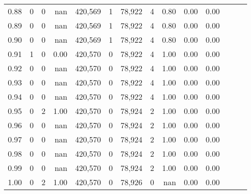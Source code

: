 \begin{tabular}{rrrrrrrrrrrrrr}
0.88 &       0 &      0 &   nan &  420,569 &        1 &  78,922 &       4 &  0.80 &  0.00 &      0.00 \\
0.89 &       0 &      0 &   nan &  420,569 &        1 &  78,922 &       4 &  0.80 &  0.00 &      0.00 \\
0.90 &       0 &      0 &   nan &  420,569 &        1 &  78,922 &       4 &  0.80 &  0.00 &      0.00 \\
0.91 &       1 &      0 &  0.00 &  420,570 &        0 &  78,922 &       4 &  1.00 &  0.00 &      0.00 \\
0.92 &       0 &      0 &   nan &  420,570 &        0 &  78,922 &       4 &  1.00 &  0.00 &      0.00 \\
0.93 &       0 &      0 &   nan &  420,570 &        0 &  78,922 &       4 &  1.00 &  0.00 &      0.00 \\
0.94 &       0 &      0 &   nan &  420,570 &        0 &  78,922 &       4 &  1.00 &  0.00 &      0.00 \\
0.95 &       0 &      2 &  1.00 &  420,570 &        0 &  78,924 &       2 &  1.00 &  0.00 &      0.00 \\
0.96 &       0 &      0 &   nan &  420,570 &        0 &  78,924 &       2 &  1.00 &  0.00 &      0.00 \\
0.97 &       0 &      0 &   nan &  420,570 &        0 &  78,924 &       2 &  1.00 &  0.00 &      0.00 \\
0.98 &       0 &      0 &   nan &  420,570 &        0 &  78,924 &       2 &  1.00 &  0.00 &      0.00 \\
0.99 &       0 &      0 &   nan &  420,570 &        0 &  78,924 &       2 &  1.00 &  0.00 &      0.00 \\
1.00 &       0 &      2 &  1.00 &  420,570 &        0 &  78,926 &       0 &   nan &  0.00 &      0.00 \\
\bottomrule
\end{tabular}

